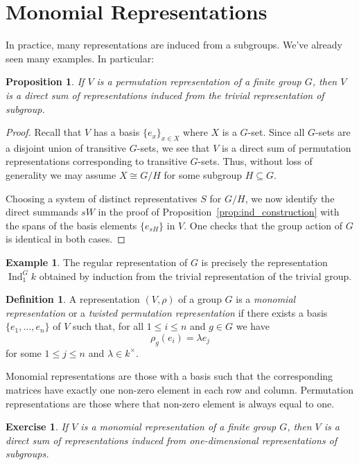 \documentclass[12pt]{article}
\theoremstyle{plain}
\newtheorem{proposition}[theorem]{Proposition}
\newtheorem{exercise}[theorem]{Exercise}
\theoremstyle{definition}
\newtheorem{definition}[theorem]{Definition}
\newtheorem{example}[theorem]{Example}
\theoremstyle{remark}
\numberwithin{equation}{section}
\begin{document}
\section{Monomial Representations}

In practice, many representations are induced from a subgroups.  We've
already seen many examples.  In particular:

\begin{proposition}
If $V$ is a permutation representation of a finite group $G$,
then $V$ is a direct sum of representations induced from the trivial
representation of subgroup.
\end{proposition}

\begin{proof}
Recall that $V$ has a basis $\{e_x\}_{x \in X}$ where $X$ is a $G$-set.
Since all $G$-sets are a disjoint union of transitive $G$-sets,
we see that $V$ is a direct sum of permutation representations
corresponding to transitive $G$-sets.  Thus, without loss of generality
we may assume $X \cong G/H$ for some subgroup $H \subseteq G$.

Choosing a system of distinct representatives $S$ for $G/H$,
we now identify the direct summands $sW$ in the proof of
Proposition~\ref{prop:ind_construction} with the spans of
the basis elements $\{ e_{sH} \}$ in $V$.
One checks that the group action of $G$ is identical in both cases.
\end{proof}

\begin{example}
The regular representation of $G$ is precisely the
representation $\operatorname{Ind}^G_1 k$
obtained by induction from the trivial representation of the trivial
group.
\end{example}

\begin{definition}
A representation $(V,\rho)$ of a group $G$ is a \emph{monomial
representation} or a \emph{twisted permutation representation} if 
there exists a basis $\{e_1,\ldots,e_n\}$ of $V$
such that, for all $1 \le i \le n$ and $g \in G$
we have
\[ \rho_g(e_i)=\lambda e_j\]
for some $1 \le j \le n$ and $\lambda \in k^\times$.
\end{definition}

Monomial representations are those with a basis such that the
corresponding matrices have
exactly one non-zero element in each row and column.
Permutation representations are those where that non-zero element is
always equal to one.

\begin{exercise}
If $V$ is a monomial representation of a finite group $G$,
then $V$ is a direct sum of representations induced from one-dimensional
representations of subgroups.
\end{exercise}
\end{document}
